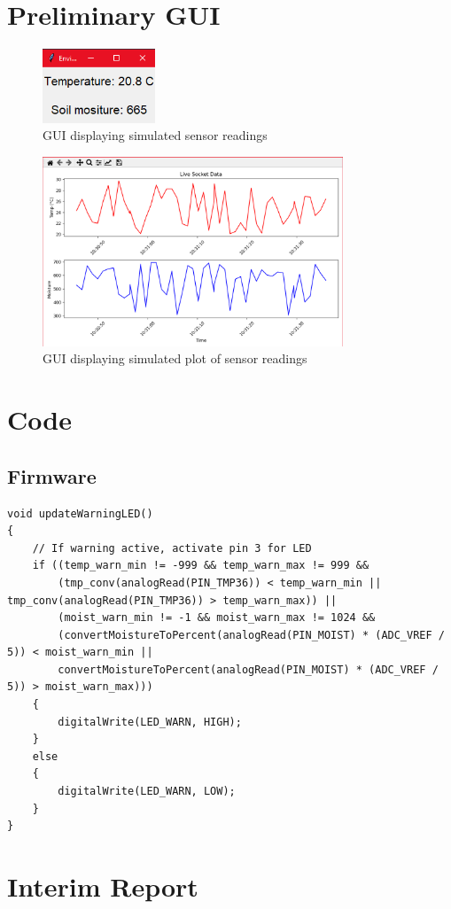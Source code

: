 \documentclass[a4paper,11pt]{article}
\begin{document}
\newpage
\appendix

\section{Preliminary GUI}

\begin{figure}[H]
    \centering
    \includegraphics[width=0.3\textwidth]{Dummy Readings.png}
    \caption{GUI displaying simulated sensor readings}
    \label{fig:prelim_GUI_readings}
\end{figure}

\begin{figure}[H]
    \centering
    \includegraphics[width=0.8\textwidth]{Dummy Plotting.png}
    \caption{GUI displaying simulated plot of sensor readings}
    \label{fig:prelim_GUI_plot}
\end{figure}

\section{Code}
\subsection{Firmware}

\begin{lstlisting}[style=cpp-style, 
caption={LED warning light}, label={prog:LED}]
void updateWarningLED()
{
    // If warning active, activate pin 3 for LED
    if ((temp_warn_min != -999 && temp_warn_max != 999 &&
        (tmp_conv(analogRead(PIN_TMP36)) < temp_warn_min || tmp_conv(analogRead(PIN_TMP36)) > temp_warn_max)) ||
        (moist_warn_min != -1 && moist_warn_max != 1024 &&
        (convertMoistureToPercent(analogRead(PIN_MOIST) * (ADC_VREF / 5)) < moist_warn_min ||
        convertMoistureToPercent(analogRead(PIN_MOIST) * (ADC_VREF / 5)) > moist_warn_max)))
    {
        digitalWrite(LED_WARN, HIGH);
    }
    else
    {
        digitalWrite(LED_WARN, LOW);
    }
}
\end{lstlisting}

\section{Interim Report}
\end{document}

